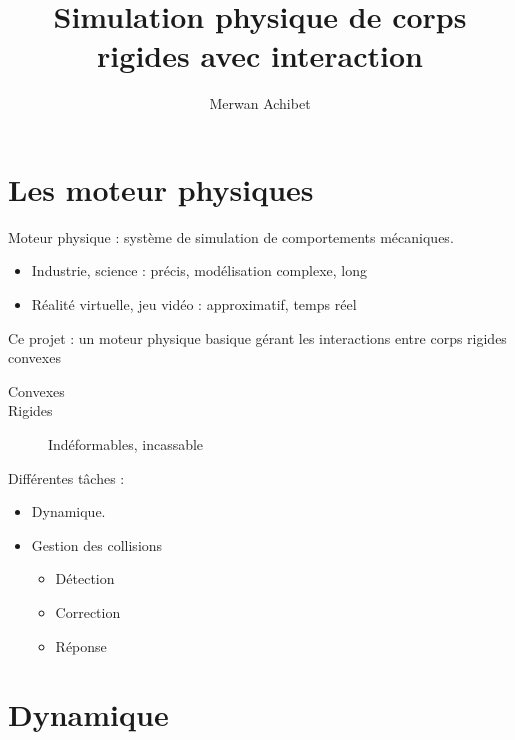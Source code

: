 \documentclass{beamer}
\title{Simulation physique de corps rigides avec interaction}
\author{Merwan Achibet}
\date{}
\begin{document}
\shorthandoff{!} %

\begin{frame}
  \maketitle
\end{frame}

\section{Les moteur physiques}

\begin{frame}
  Moteur physique : système de simulation de comportements mécaniques.

  \begin{itemize}
    \item Industrie, science : précis, modélisation complexe, long
    \item Réalité virtuelle, jeu vidéo : approximatif, temps réel
  \end{itemize}
\end{frame}

\begin{frame}
  Ce projet : un moteur physique basique gérant les interactions entre corps rigides convexes
  \begin{description}
    \item[Convexes] 
    \item[Rigides] Indéformables, incassable
  \end{description}
\end{frame}

\begin{frame}
  Différentes tâches :
  \begin{itemize}
    \item Dynamique.
    \item Gestion des collisions
      \begin{itemize}
        \item Détection
        \item Correction
        \item Réponse
      \end{itemize}
    \end{itemize}
\end{frame}

\section{Dynamique}
\end{document}
